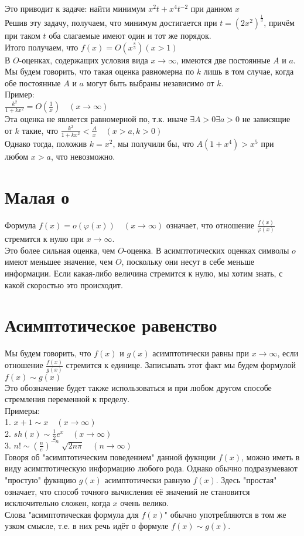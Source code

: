 \documentclass{report}
\begin{document}
Это приводит к задаче: найти минимум $x^{2}t+x^{4}t^{-2}$ при данном $x$ \\
Решив эту задачу, получаем, что минимум достигается при $t={(2x^{2})}^{\frac{1}{3}}$, причём при таком $t$ оба слагаемые имеют один и тот же порядок.\\
Итого получаем, что $f(x)=O(x^{\frac{8}{3}})(x>1)$\\
В $O$-оценках, содержащих условия вида $x\to\infty$, имеются две постоянные $A$ и $a$. Мы будем говорить, что такая оценка равномерна по $k$ лишь в том случае, когда
обе постоянные $A$ и $a$ могут быть выбраны независимо от $k$. \\
Пример: \\
$\frac{k^{2}}{1+kx^{2}}=O(\frac{1}{x})\quad(x\to\infty)$ \\
Эта оценка не является равномерной по, т.к. иначе $\exists A>0 \exists a>0$ не зависящие от $k$ такие, что $\frac{k^{2}}{1+kx^{2}}<\frac{A}{x}\quad(x>a,k>0)$ \\
Однако тогда, положив $k=x^{2}$, мы получили бы, что $A(1+x^{4})>x^{5}$ при любом $x>a$, что невозможно.
\newpage
\section{Малая о}
Формула $f(x)=o(\varphi(x))\quad(x\to\infty)$ означает, что отношение $\frac{f(x)}{\varphi(x)}$ стремится к нулю при $x\to\infty$. \\
Это более сильная оценка, чем $O$-оценка. В асимптотических оценках символы $o$ имеют меньшее значение, чем $O$, поскольку они несут в себе меньше информации.
Если какая-либо величина стремится к нулю, мы хотим знать, с какой скоростью это происходит.
\newpage
\section{Асимптотическое равенство}
Мы будем говорить, что $f(x)$ и $g(x)$ асимптотически равны при $x\to\infty$, 
если отношение $\frac{f(x)}{g(x)}$ стремится к единице. Записывать этот факт мы будем формулой $f(x)\mathtt{\sim}g(x)$ \\
Это обозначение будет также использоваться и при любом другом способе стремления переменной к пределу. \\
Примеры: \\
1. $x+1\mathtt{\sim}x\quad(x\to\infty)$ \\
2. $sh(x)\mathtt{\sim}\frac{1}{2}e^{x}\quad(x\to\infty)$ \\
3. $n!\mathtt{\sim}{(\frac{n}{e})}^{-n}\sqrt[]{2n\pi}\quad(n\to\infty)$ \\
Говоря об "асимптотическим поведением" данной фукнции $f(x)$, можно иметь в виду асимптотическую информацию любого рода. Однако обычно подразумевают "простую" фукнцию $g(x)$
асимптотически равную $f(x)$. Здесь "простая" означает, что способ точного вычисления её значений не становится исключительно сложен, когда $x$ очень велико. \\
Слова "асимптотическая формула для $f(x)$" обычно употребляются в том же узком смысле, т.е. в них речь идёт о формуле $f(x)\mathtt{\sim}g(x)$.
\newpage
\end{document}
